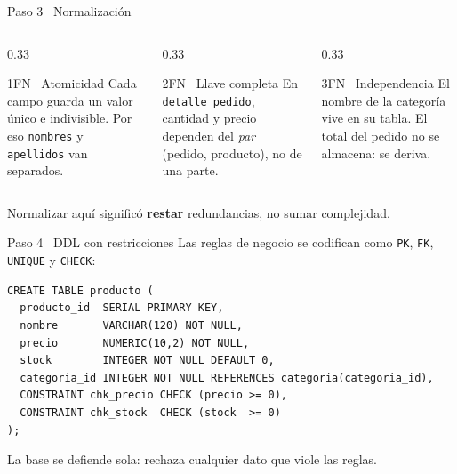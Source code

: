 \documentclass[aspectratio=169,10pt]{beamer}
\begin{document}
\begin{frame}{Paso 3 \textbar\ Normalización}
  \begin{columns}[t]
    \begin{column}{0.33\textwidth}
      \begin{block}{1FN \textemdash\ Atomicidad}
        \small Cada campo guarda un valor único e indivisible. Por eso
        \texttt{nombres} y \texttt{apellidos} van separados.
      \end{block}
    \end{column}
    \begin{column}{0.33\textwidth}
      \begin{block}{2FN \textemdash\ Llave completa}
        \small En \texttt{detalle\_pedido}, cantidad y precio dependen del
        \emph{par} (pedido, producto), no de una parte.
      \end{block}
    \end{column}
    \begin{column}{0.33\textwidth}
      \begin{block}{3FN \textemdash\ Independencia}
        \small El nombre de la categoría vive en su tabla. El total del pedido
        no se almacena: se deriva.
      \end{block}
    \end{column}
  \end{columns}
  \vspace{0.6em}
  \begin{center}
    \small\color{urGris}
    Normalizar aquí significó \textbf{restar} redundancias, no sumar complejidad.
  \end{center}
\end{frame}

\begin{frame}[fragile]{Paso 4 \textbar\ DDL con restricciones}
  Las reglas de negocio se codifican como \texttt{PK}, \texttt{FK}, \texttt{UNIQUE} y \texttt{CHECK}:
  \begin{lstlisting}[style=sql]
CREATE TABLE producto (
  producto_id  SERIAL PRIMARY KEY,
  nombre       VARCHAR(120) NOT NULL,
  precio       NUMERIC(10,2) NOT NULL,
  stock        INTEGER NOT NULL DEFAULT 0,
  categoria_id INTEGER NOT NULL REFERENCES categoria(categoria_id),
  CONSTRAINT chk_precio CHECK (precio >= 0),
  CONSTRAINT chk_stock  CHECK (stock  >= 0)
);
  \end{lstlisting}
  \begin{center}
    \small\color{urGris}
    La base se defiende sola: rechaza cualquier dato que viole las reglas.
  \end{center}
\end{frame}
\end{document}
